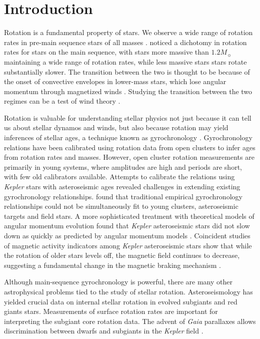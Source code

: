 \documentclass[preprint2]{aastex62}
\newcommand{\Kepler}{\mbox{\textit{Kepler}}}
\newcommand{\Gaia}{\mbox{\textit{Gaia}}}
\begin{document}

\section{Introduction}

Rotation is a fundamental property of stars. We observe a wide range of
rotation rates in pre-main sequence stars of all masses \citep{Attridge92,
Herbst00, Henderson12}. \citet{Kraft67} noticed a dichotomy in rotation rates
for stars on the main sequence, with stars more massive than \(1.2 M_\sun{}\) maintaining a wide range of
rotation rates, while less massive stars stars rotate substantially slower. The
transition between the two is thought to be because of the onset of convective
envelopes in lower-mass stars, which lose angular momentum through magnetized
winds \citep{Parker58,Weber67,Kawaler88}. Studying the transition between the
two regimes can be a test of wind theory \citep{vanSaders13}.

Rotation is valuable for understanding stellar physics not just because it can
tell us about stellar dynamos and winds, but also because rotation may yield 
inferences of stellar ages, a
technique known as gyrochronology \citep{Barnes07,Mamajek08}.  Gyrochronology
relations have been calibrated using rotation data from open clusters to infer 
ages from rotation rates and masses. However, open
cluster rotation measurements are primarily in young systems, where amplitudes
are high and periods are short, with few old calibrators available. Attempts to
calibrate the relations using \Kepler{} stars with 
asteroseismic ages revealed challenges in extending existing gyrochronology
relationships. \citet{Angus15} found that traditional empirical gyrochronology
relationships could not be simultaneously fit to young clusters, asteroseismic
targets and field stars. A more sophisticated treatment with theoretical models
of angular momentum evolution found that \Kepler{} asteroseismic stars did not
slow down as quickly as predicted by angular momentum models
\citep{vanSaders16}. Coincident studies of magnetic activity indicators among
\Kepler{} asteroseismic stars show that while the rotation of older stars
levels off, the magnetic field continues to decrease, suggesting a fundamental
change in the magnetic braking mechanism \citep{Metcalfe16,vanSaders16,
Metcalfe17}.

Although main-sequence gyrochronology is powerful, there are many other
astrophysical problems tied to the study of stellar rotation. Asteroseismology
has yielded crucial data on internal stellar rotation in evolved subgiants
\citep[e.g.][]{Deheuvels14} and red giants \citep{Mosser12,Gehan18} stars.
Measurements of surface rotation rates are important for interpreting the
subgiant core rotation data. The advent of
\Gaia{} parallaxes allows discrimination between dwarfs and subgiants in the
\Kepler{} field \citep{Berger18b}. 
\end{document}

